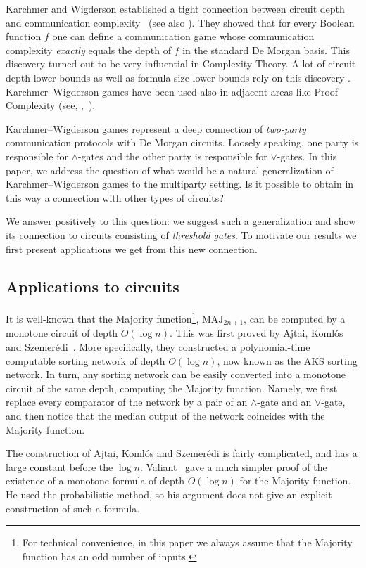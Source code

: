 \documentclass{toc}
\def\MAJ{\mathrm{MAJ}}
\begin{document}
Karchmer and Wigderson established a tight connection between circuit depth
and communication complexity~\cite{KW90} (see also \cite[Chapter 9]{rao_yehudayoff_2020}).  %
They  %
showed that for every Boolean function $f$ one can define a communication game whose communication complexity \emph{exactly} equals the depth of $f$ in the standard De Morgan basis. This discovery turned out to be very influential in Complexity Theory. A lot of circuit depth lower bounds as well as formula size lower bounds rely on this discovery \cite{KRW95, RM97, GMWW2014, GP2014, DM2018}. Karchmer--Wigderson games have been used also in adjacent areas like Proof Complexity (see, \eg,~\cite{Sok2017}).

Karchmer--Wigderson games represent a deep connection of \emph{two-party} communication protocols with De Morgan circuits. Loosely speaking, one party is responsible for $\land$-gates and the other party is responsible for $\lor$-gates. In this paper, we address the question of what would be a natural generalization of Karchmer--Wigderson games to the multiparty setting. Is it possible to obtain in this way a connection with other types of circuits?

We answer positively to this question: we suggest such a generalization and show its connection to circuits consisting of \emph{threshold gates}. To motivate our results we first present applications we get from this new connection.

\subsection{Applications to circuits}

It is well-known that the Majority function\footnote{For technical convenience, in this paper we always assume that the Majority function has an odd number of inputs.},  $\MAJ_{2n + 1}$, can be computed by 
%
a monotone circuit of depth $O(\log n)$.  %
This was first proved by Ajtai, Koml\'{o}s and Szemer\'{e}di~\cite{AKS83}. More specifically, they constructed a polynomial-time computable 
%
sorting network of depth $O(\log n)$, %
now known as the AKS sorting network. In turn, any sorting network can be easily converted into a monotone circuit of the same depth, computing the Majority function. Namely, we first replace every comparator of the network by a pair of an $\land$-gate and an $\lor$-gate, and then notice that the median output of the network coincides with the Majority function.

The construction of Ajtai, Koml\'{o}s and Szemer\'{e}di is fairly complicated, and has a %
large  %
constant before the $\log n$. Valiant~\cite{val84} gave a much simpler proof of %
the existence  %
%
of a monotone formula of depth $O(\log n)$
for the Majority function. He used the probabilistic method, so his argument does not give an explicit construction of such a formula.
\end{document}
